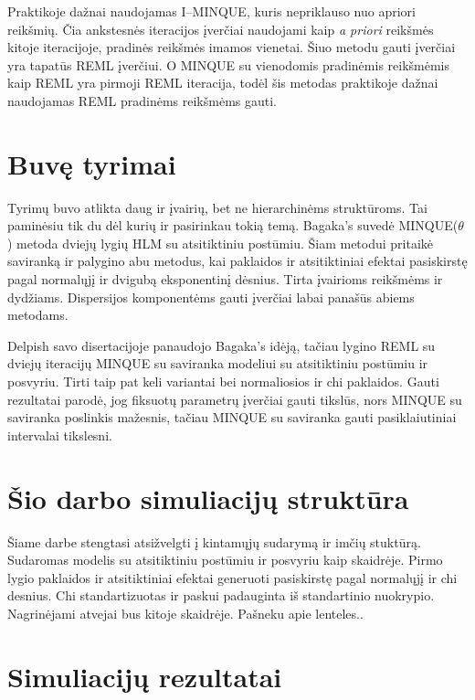 \documentclass[12pt,a4paper]{article}
\begin{document}
Praktikoje dažnai naudojamas I--MINQUE, kuris nepriklauso nuo apriori reikšmių. Čia ankstesnės iteracijos įverčiai naudojami kaip \textit{a priori} reikšmės kitoje iteracijoje, pradinės reikšmės imamos vienetai. Šiuo metodu gauti įverčiai yra tapatūs REML įverčiui. O MINQUE su vienodomis pradinėmis reikšmėmis kaip REML yra pirmoji REML iteracija, todėl šis metodas praktikoje dažnai naudojamas REML pradinėms reikšmėms gauti.


\section*{Buvę tyrimai}
Tyrimų buvo atlikta daug ir įvairių, bet ne hierarchinėms struktūroms. Tai paminėsiu tik du dėl kurių ir pasirinkau tokią temą. Bagaka's  suvedė MINQUE($\theta$) metoda dviejų lygių HLM su atsitiktiniu postūmiu. Šiam metodui pritaikė saviranką ir palygino abu metodus, kai paklaidos ir atsitiktiniai efektai pasiskirstę pagal normalųjį ir dvigubą eksponentinį dėsnius. Tirta įvairioms reikšmėms ir dydžiams. Dispersijos komponentėms gauti įverčiai labai panašūs abiems metodams.

Delpish savo disertacijoje panaudojo Bagaka's idėją, tačiau lygino REML su dviejų iteracijų MINQUE su saviranka modeliui su atsitiktiniu postūmiu ir posvyriu. Tirti taip pat keli variantai bei normaliosios ir chi paklaidos. Gauti rezultatai parodė, jog fiksuotų parametrų įverčiai gauti tikslūs, nors MINQUE su saviranka poslinkis mažesnis, tačiau MINQUE su saviranka gauti pasiklaiutiniai intervalai tikslesni.


\section*{Šio darbo simuliacijų struktūra}
Šiame darbe stengtasi atsižvelgti į kintamųjų sudarymą ir imčių stuktūrą. Sudaromas modelis su atsitiktiniu postūmiu ir posvyriu kaip skaidrėje. Pirmo lygio paklaidos ir atsitiktiniai efektai generuoti pasiskirstę pagal normalųjį ir chi desnius. Chi standartizuotas ir paskui padauginta iš standartinio nuokrypio. Nagrinėjami atvejai bus kitoje skaidrėje. Pašneku apie lenteles..

\section*{Simuliacijų rezultatai}
\end{document}

